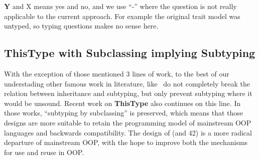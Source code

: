 \noindent \textbf{Y} and X means yes and no, and we use ``-'' where the question is not really applicable to the current approach. For example the original trait model was untyped, so typing questions makes no sense here.

\subsection{ThisType with Subclassing implying Subtyping}
With the exception of those mentioned 3 lines of work, to the best of our understading
other famous work in literature, like~\cite{odersky2008programming,nystrom2006j}
do not completely break the relation between inheritance and subtyping, but only prevent subtyping where 
it would be unsound.
Recent work on {\bf ThisType} \cite{Saito:2009,ryu16ThisType}
also continues on this line.
In those works, ``subtyping by subclassing'' is preserved, which means
that those designs are more suitable to retain the programming model
of mainstream OOP languages and backwards compatibility. The design 
of \name (and 42) is a more radical departure of mainstream OOP, with
the hope to improve both the mechanisms for use and reuse in OOP.


